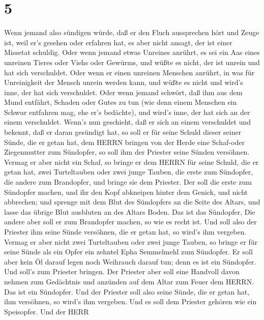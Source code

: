 \hypertarget{section-4}{%
\section{5}\label{section-4}}

 Wenn jemand also sündigen würde, daß er den Fluch
aussprechen hört und Zeuge ist, weil er's gesehen oder erfahren hat, es
aber nicht ansagt, der ist einer Missetat schuldig.  Oder
wenn jemand etwas Unreines anrührt, es sei ein Aas eines unreinen Tieres
oder Viehs oder Gewürms, und wüßte es nicht, der ist unrein und hat sich
verschuldet.  Oder wenn er einen unreinen Menschen anrührt,
in was für Unreinigkeit der Mensch unrein werden kann, und wüßte es
nicht und wird's inne, der hat sich verschuldet.  Oder wenn
jemand schwört, daß ihm aus dem Mund entfährt, Schaden oder Gutes zu tun
(wie denn einem Menschen ein Schwur entfahren mag, ehe er's bedächte),
und wird's inne, der hat sich an der einem verschuldet. 
Wenn's nun geschieht, daß er sich an einem verschuldet und bekennt, daß
er daran gesündigt hat,  so soll er für seine Schuld dieser
seiner Sünde, die er getan hat, dem HERRN bringen von der Herde eine
Schaf-oder Ziegenmutter zum Sündopfer, so soll ihm der Priester seine
Sünden versöhnen.  Vermag er aber nicht ein Schaf, so bringe
er dem HERRN für seine Schuld, die er getan hat, zwei Turteltauben oder
zwei junge Tauben, die erste zum Sündopfer, die andere zum Brandopfer,
 und bringe sie dem Priester. Der soll die erste zum
Sündopfer machen, und ihr den Kopf abkneipen hinter dem Genick, und
nicht abbrechen;  und sprenge mit dem Blut des Sündopfers an
die Seite des Altars, und lasse das übrige Blut ausbluten an des Altars
Boden. Das ist das Sündopfer,  Die andere aber soll er zum
Brandopfer machen, so wie es recht ist. Und soll also der Priester ihm
seine Sünde versöhnen, die er getan hat, so wird's ihm vergeben.
 Vermag er aber nicht zwei Turteltauben oder zwei junge
Tauben, so bringe er für seine Sünde als ein Opfer ein zehntel Epha
Semmelmehl zum Sündopfer. Er soll aber kein Öl darauf legen noch
Weihrauch darauf tun; denn es ist ein Sündopfer.  Und
soll's zum Priester bringen. Der Priester aber soll eine Handvoll davon
nehmen zum Gedächtnis und anzünden auf dem Altar zum Feuer dem HERRN.
Das ist ein Sündopfer.  Und der Priester soll also seine
Sünde, die er getan hat, ihm versöhnen, so wird's ihm vergeben. Und es
soll dem Priester gehören wie ein Speisopfer.  Und der HERR
